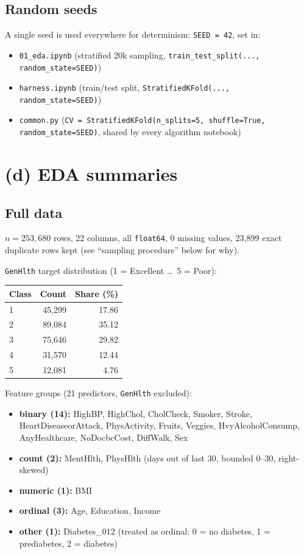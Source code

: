 \documentclass[11pt]{article}
\newcommand{\code}[1]{\texttt{#1}}
\begin{document}
\subsection*{Random seeds}

A single seed is used everywhere for determinism: \code{SEED = 42}, set in:
\begin{itemize}
    \item \code{01\_eda.ipynb} (stratified 20k sampling, \code{train\_test\_split(..., random\_state=SEED)})
    \item \code{harness.ipynb} (train/test split, \code{StratifiedKFold(..., random\_state=SEED)})
    \item \code{common.py} (\code{CV = StratifiedKFold(n\_splits=5, shuffle=True, random\_state=SEED)}, shared by every algorithm notebook)
\end{itemize}

\section*{(d) EDA summaries}

\subsection*{Full data}
$n = 253{,}680$ rows, 22 columns, all \code{float64}, 0 missing values, 23{,}899 exact duplicate rows kept (see ``sampling procedure'' below for why).

\code{GenHlth} target distribution (1 = Excellent \ldots\ 5 = Poor):

\begin{center}
\begin{tabular}{lrr}
\toprule
Class & Count & Share (\%) \\
\midrule
1 & 45,299 & 17.86 \\
2 & 89,084 & 35.12 \\
3 & 75,646 & 29.82 \\
4 & 31,570 & 12.44 \\
5 & 12,081 & 4.76 \\
\bottomrule
\end{tabular}
\end{center}

Feature groups (21 predictors, \code{GenHlth} excluded):
\begin{itemize}
    \item \textbf{binary (14):} HighBP, HighChol, CholCheck, Smoker, Stroke, HeartDiseaseorAttack, PhysActivity, Fruits, Veggies, HvyAlcoholConsump, AnyHealthcare, NoDocbcCost, DiffWalk, Sex
    \item \textbf{count (2):} MentHlth, PhysHlth (days out of last 30, bounded 0--30, right-skewed)
    \item \textbf{numeric (1):} BMI
    \item \textbf{ordinal (3):} Age, Education, Income
    \item \textbf{other (1):} Diabetes\_012 (treated as ordinal: 0 = no diabetes, 1 = prediabetes, 2 = diabetes)
\end{itemize}
\end{document}
